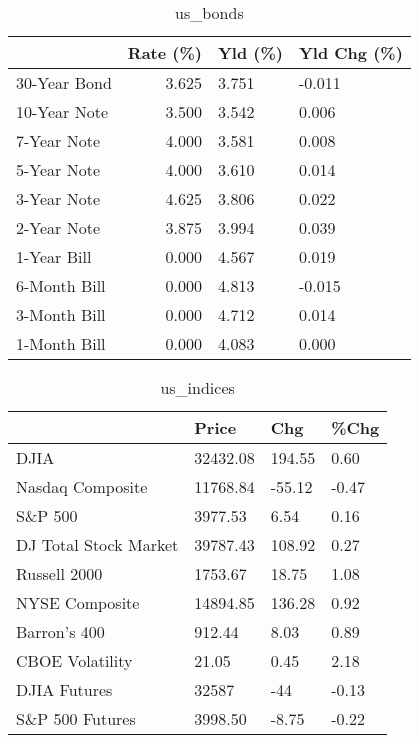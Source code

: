 \documentclass{article}%
\begin{document}
%


\begin{table}[htbp]%
\caption{us\_bonds}%
\centering%
\begin{adjustbox}{width=1\textwidth}%
\begin{tabular}{lrll}
\toprule
             &  Rate (\%) & Yld (\%) & Yld Chg (\%) \\
\midrule
30-Year Bond &     3.625 &   3.751 &      -0.011 \\
10-Year Note &     3.500 &   3.542 &       0.006 \\
 7-Year Note &     4.000 &   3.581 &       0.008 \\
 5-Year Note &     4.000 &   3.610 &       0.014 \\
 3-Year Note &     4.625 &   3.806 &       0.022 \\
 2-Year Note &     3.875 &   3.994 &       0.039 \\
 1-Year Bill &     0.000 &   4.567 &       0.019 \\
6-Month Bill &     0.000 &   4.813 &      -0.015 \\
3-Month Bill &     0.000 &   4.712 &       0.014 \\
1-Month Bill &     0.000 &   4.083 &       0.000 \\
\bottomrule
\end{tabular}
%
\end{adjustbox}%
\end{table}

%


\begin{table}[htbp]%
\caption{us\_indices}%
\centering%
\begin{adjustbox}{width=1\textwidth}%
\begin{tabular}{llll}
\toprule
                      &    Price &    Chg &  \%Chg \\
\midrule
                 DJIA & 32432.08 & 194.55 &  0.60 \\
     Nasdaq Composite & 11768.84 & -55.12 & -0.47 \\
              S\&P 500 &  3977.53 &   6.54 &  0.16 \\
DJ Total Stock Market & 39787.43 & 108.92 &  0.27 \\
         Russell 2000 &  1753.67 &  18.75 &  1.08 \\
       NYSE Composite & 14894.85 & 136.28 &  0.92 \\
         Barron's 400 &   912.44 &   8.03 &  0.89 \\
      CBOE Volatility &    21.05 &   0.45 &  2.18 \\
         DJIA Futures &    32587 &    -44 & -0.13 \\
      S\&P 500 Futures &  3998.50 &  -8.75 & -0.22 \\
\bottomrule
\end{tabular}
%
\end{adjustbox}%
\end{table}
\end{document}
